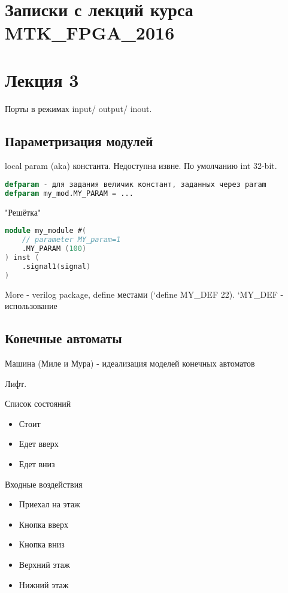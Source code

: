 \documentclass[a4paper, 12pt]{extarticle}
\begin{document}
	\def \nocredits {}

\section{Записки с лекций курса MTK{\_}FPGA{\_}2016}
\section{Лекция 3}

	Порты в режимах input/ output/ inout.

	\subsection{Параметризация модулей}

		local param (aka) константа. Недоступна извне. По умолчанию int 32-bit.

\begin{lstlisting}[language=Verilog]
defparam - для задания величик констант, заданных через param
defparam my_mod.MY_PARAM = ...
\end{lstlisting}

		"Решётка"

\begin{lstlisting}[language=Verilog]
module my_module #(
	// parameter MY_param=1
	.MY_PARAM (100)
) inst (
	.signal1(signal)
)
\end{lstlisting}

		More - verilog package, define местами (`define MY{\_}DEF 22).
		`MY{\_}DEF - использование



	\subsection{Конечные автоматы}
		Машина (Миле и Мура) - идеализация моделей конечных автоматов

		Лифт.

		Список состояний
		\begin{itemize}
			\item Стоит
			\item Едет вверх
			\item Едет вниз
		\end{itemize}

		Входные воздействия
		\begin{itemize}
			\item Приехал на этаж
			\item Кнопка вверх
			\item Кнопка вниз
			\item Верхний этаж
			\item Нижний этаж
		\end{itemize}
\end{document}
